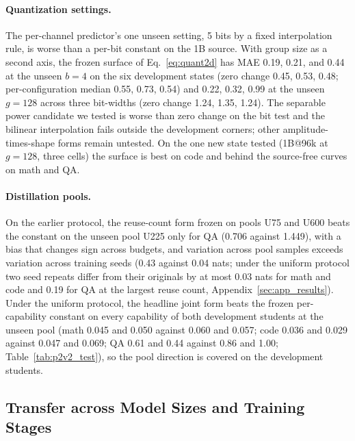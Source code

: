 \paragraph{Quantization settings.} The per-channel predictor's one
unseen setting, 5 bits by a fixed interpolation rule, is worse than a
per-bit constant on the 1B source. With group size as a second axis,
the frozen surface of Eq.~\eqref{eq:quant2d} has MAE 0.19, 0.21, and
0.44 at the unseen $b=4$ on the six development states (zero change
0.45, 0.53, 0.48; per-configuration median 0.55, 0.73, 0.54) and
0.22, 0.32, 0.99 at the unseen $g=128$ across three bit-widths (zero
change 1.24, 1.35, 1.24). The separable power candidate we tested is
worse than zero change on the bit test and the bilinear interpolation
fails outside the development corners; other amplitude-times-shape
forms remain untested. On the one new state tested (1B@96k at
$g=128$, three cells) the surface is best on code and behind the
source-free curves on math and QA.

\paragraph{Distillation pools.} On the earlier protocol, the
reuse-count form frozen on pools U75 and U600 beats the constant on
the unseen pool U225 only for QA (0.706 against 1.449), with a bias
that changes sign across budgets, and variation across pool samples
exceeds variation across training seeds (0.43 against 0.04 nats;
under the uniform protocol two seed repeats differ from their
originals by at most 0.03 nats for math and code and 0.19 for QA at
the largest reuse count, Appendix~\ref{sec:app_results}). Under the
uniform protocol, the headline joint form beats the frozen
per-capability constant on every capability of both development
students at the unseen pool (math 0.045 and 0.050 against 0.060 and
0.057; code 0.036 and 0.029 against 0.047 and 0.069; QA 0.61 and 0.44
against 0.86 and 1.00; Table~\ref{tab:p2v2_test}), so the pool
direction is covered on the development students.

\subsection{Transfer across Model Sizes and Training Stages}
\label{sec:unseen_states}

